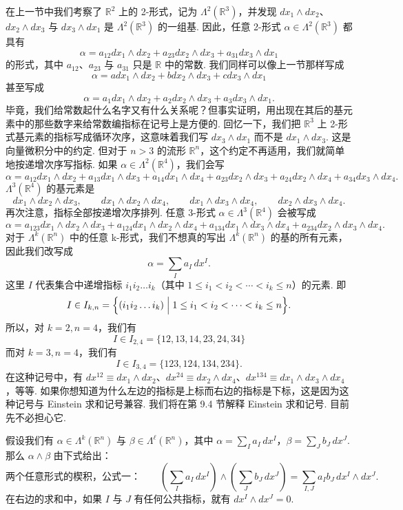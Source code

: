 在上一节中我们考察了 $\mathbb{R}^2$ 上的 2-形式，记为 $\Lambda^2(\mathbb{R}^3)$，并发现 $dx_1\wedge dx_2$、$dx_2\wedge dx_3$ 与 $dx_3\wedge dx_1$ 是 $\Lambda^2(\mathbb{R}^3)$ 的一组基. 因此，任意 2-形式 $\alpha\in\Lambda^2(\mathbb{R}^3)$ 都具有
\[
\alpha=a_{12}dx_1\wedge dx_2+a_{23}dx_2\wedge dx_3+a_{31}dx_3\wedge dx_1
\]
的形式，其中 $a_{12}$、$a_{23}$ 与 $a_{31}$ 只是 $\mathbb{R}$ 中的常数. 我们同样可以像上一节那样写成
\[
\alpha=adx_1\wedge dx_2+bdx_2\wedge dx_3+cdx_3\wedge dx_1
\]
甚至写成
\[
\alpha=a_1dx_1\wedge dx_2+a_2dx_2\wedge dx_3+a_3dx_3\wedge dx_1.
\]
毕竟，我们给常数起什么名字又有什么关系呢？但事实证明，用出现在其后的基元素中的那些数字来给常数编指标在记号上是方便的. 回忆一下，我们把 $\mathbb{R}^3$ 上 2-形式基元素的指标写成循环次序，这意味着我们写 $dx_3\wedge dx_1$ 而不是 $dx_1\wedge dx_3$. 这是向量微积分中的约定. 但对于 $n>3$ 的流形 $\mathbb{R}^n$，这个约定不再适用，我们就简单地按递增次序写指标. 如果 $\alpha\in\Lambda^2(\mathbb{R}^4)$，我们会写
\[
\alpha=a_{12}dx_1\wedge dx_2+a_{13}dx_1\wedge dx_3+a_{14}dx_1\wedge dx_4
+a_{23}dx_2\wedge dx_3+a_{24}dx_2\wedge dx_4+a_{34}dx_3\wedge dx_4.
\]
$\Lambda^3(\mathbb{R}^4)$ 的基元素是
\[
dx_1\wedge dx_2\wedge dx_3,\qquad
dx_1\wedge dx_2\wedge dx_4,\qquad
dx_1\wedge dx_3\wedge dx_4,\qquad
dx_2\wedge dx_3\wedge dx_4.
\]
再次注意，指标全部按递增次序排列. 任意 3-形式 $\alpha\in\Lambda^3(\mathbb{R}^4)$ 会被写成
\[
\alpha=a_{123}dx_1\wedge dx_2\wedge dx_3+a_{124}dx_1\wedge dx_2\wedge dx_4
+a_{134}dx_1\wedge dx_3\wedge dx_4+a_{234}dx_2\wedge dx_3\wedge dx_4.
\]
对于 $\Lambda^k(\mathbb{R}^n)$ 中的任意 k-形式，我们不想真的写出 $\Lambda^k(\mathbb{R}^n)$ 的基的所有元素，因此我们改写成
\[
\alpha=\sum_{I}a_I\,dx^I.
\]
这里 $I$ 代表集合中递增指标 $i_1i_2\ldots i_k$（其中 $1\leq i_1<i_2<\cdots<i_k\leq n$）的元素. 即
\[
I\in I_{k,n}=\Bigl\{(i_1i_2\ldots i_k)\;\Big|\;1\leq i_1<i_2<\cdots<i_k\leq n\Bigr\}.
\]
所以，对 $k=2,n=4$，我们有
\[
I\in I_{2,4}=\{12,13,14,23,24,34\}
\]
而对 $k=3,n=4$，我们有
\[
I\in I_{3,4}=\{123,124,134,234\}.
\]
在这种记号中，有 $dx^{12}\equiv dx_1\wedge dx_2$、$dx^{24}\equiv dx_2\wedge dx_4$、$dx^{134}\equiv dx_1\wedge dx_3\wedge dx_4$，等等. 如果你想知道为什么左边的指标是上标而右边的指标是下标，这是因为这种记号与 Einstein 求和记号兼容. 我们将在第 9.4 节解释 Einstein 求和记号. 目前先不必担心它.

假设我们有 $\alpha\in\Lambda^k(\mathbb{R}^n)$ 与 $\beta\in\Lambda^\ell(\mathbb{R}^n)$，其中 $\alpha=\sum_{I}a_I\,dx^I$，$\beta=\sum_{J}b_J\,dx^J$. 那么 $\alpha\wedge\beta$ 由下式给出：
\[
\text{两个任意形式的楔积，公式一：}\qquad
\left(\sum_{I}a_I\,dx^I\right)\wedge\left(\sum_{J}b_J\,dx^J\right)
=\sum_{I,J}a_Ib_J\,dx^I\wedge dx^J.
\]
在右边的求和中，如果 $I$ 与 $J$ 有任何公共指标，就有 $dx^I\wedge dx^J=0$.

